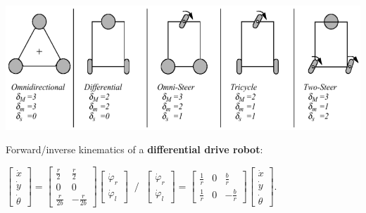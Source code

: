 \documentclass[landscape]{article}
\newcommand{\vmspace}{\vspace{-7pt}}
\newcommand{\vpspace}{\vspace{5pt}}
\begin{document}
\begin{multicols}{3}
\vpspace

\begin{minipage}{\columnwidth}
  \includegraphics[width=\columnwidth]{img/3_WheelTypes.png}
\end{minipage}

\begin{minipage}{\columnwidth}
  Forward/inverse kinematics of a \textbf{differential drive robot}:
  \vmspace
  \begin{center}
    $
    \left[
    \begin{matrix}
      \dot x \\
      \dot y \\
      \dot \theta
    \end{matrix}
    \right]
    =
    \left[
    \begin{matrix}
      \frac{r}{2} & \frac{r}{2} \\
      0 & 0 \\
      \frac{r}{2b} & -\frac{r}{2b}
    \end{matrix}
    \right]
    \left[
    \begin{matrix}
      \dot \varphi_r \\
      \dot \varphi_l
    \end{matrix}
    \right]
    \;\; / \;\;
    \left[
    \begin{matrix}
      \dot \varphi_r \\
      \dot \varphi_l
    \end{matrix}
    \right]
    =
    \left[
    \begin{matrix}
      \frac{1}{r} & 0 & \frac{b}{r} \\
      \frac{1}{r} & 0 & -\frac{b}{r}
    \end{matrix}
    \right]
    \left[
    \begin{matrix}
      \dot x \\
      \dot y \\
      \dot \theta
    \end{matrix}
    \right]
    $.
  \end{center}
\end{minipage}


\end{multicols}
\end{document}
